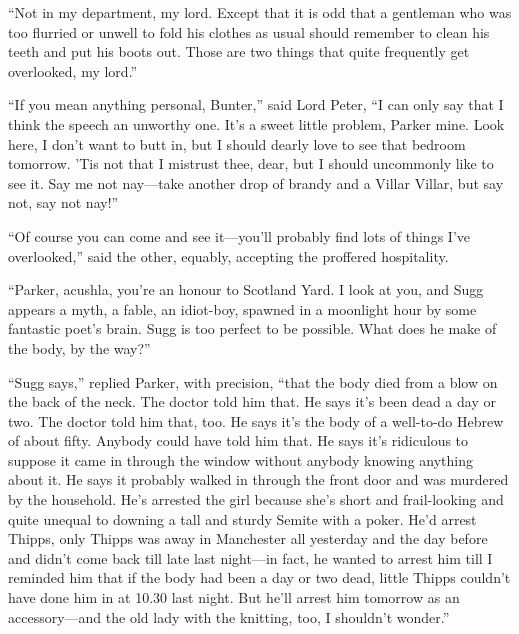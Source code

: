 \enquote{Not in my department, my lord. Except that it is odd that a gentleman who was too flurried or unwell to fold his clothes as usual should remember to clean his teeth and put his boots out. Those are two things that quite frequently get overlooked, my lord.}

\enquote{If you mean anything personal, Bunter,} said Lord Peter, \enquote{I can only say that I think the speech an unworthy one. It’s a sweet little problem, Parker mine. Look here, I don’t want to butt in, but I should dearly love to see that bedroom tomorrow. ’Tis not that I mistrust thee, dear, but I should uncommonly like to see it. Say me not nay\allowbreak---\allowbreak take another drop of brandy and a Villar Villar, but say not, say not nay!}

\enquote{Of course you can come and see it\allowbreak---\allowbreak you’ll probably find lots of things I’ve overlooked,} said the other, equably, accepting the proffered hospitality.

\enquote{Parker, acushla, you’re an honour to Scotland Yard. I look at you, and Sugg appears a myth, a fable, an idiot-boy, spawned in a moonlight hour by some fantastic poet’s brain. Sugg is too perfect to be possible. What does he make of the body, by the way?}

\enquote{Sugg says,} replied Parker, with precision, \enquote{that the body died from a blow on the back of the neck. The doctor told him that. He says it’s been dead a day or two. The doctor told him that, too. He says it’s the body of a well-to-do Hebrew of about fifty. Anybody could have told him that. He says it’s ridiculous to suppose it came in through the window without anybody knowing anything about it. He says it probably walked in through the front door and was murdered by the household. He’s arrested the girl because she’s short and frail-looking and quite unequal to downing a tall and sturdy Semite with a poker. He’d arrest Thipps, only Thipps was away in Manchester all yesterday and the day before and didn’t come back till late last night\allowbreak---\allowbreak in fact, he wanted to arrest him till I reminded him that if the body had been a day or two dead, little Thipps couldn’t have done him in at 10.30 last night. But he’ll arrest him tomorrow as an accessory\allowbreak---\allowbreak and the old lady with the knitting, too, I shouldn’t wonder.}

